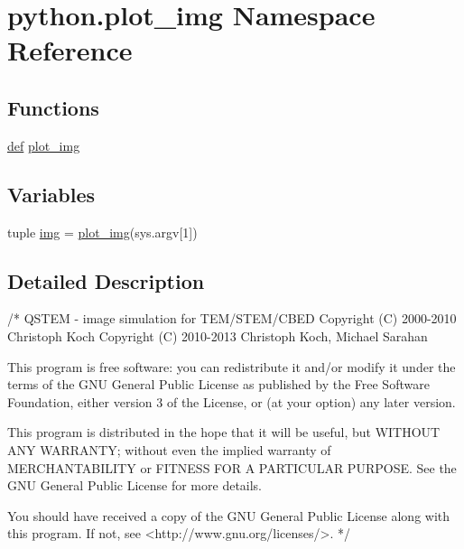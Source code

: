\hypertarget{namespacepython_1_1plot__img}{\section{python.\-plot\-\_\-img Namespace Reference}
\label{namespacepython_1_1plot__img}
}
\subsection*{Functions}
\begin{DoxyCompactItemize}
\item 
\hyperlink{sim_image_from_wave_8m_a72b6b8e83430abf007f20aeae4dc2f74}{def} \hyperlink{namespacepython_1_1plot__img_a047f12ae346602faa26f6aba9c3334e6}{plot\-\_\-img}
\end{DoxyCompactItemize}
\subsection*{Variables}
\begin{DoxyCompactItemize}
\item 
tuple \hyperlink{namespacepython_1_1plot__img_a84ab8c729acf1090901d57022bae03e4}{img} = \hyperlink{namespacepython_1_1plot__img_a047f12ae346602faa26f6aba9c3334e6}{plot\-\_\-img}(sys.\-argv\mbox{[}1\mbox{]})
\end{DoxyCompactItemize}


\subsection{Detailed Description}
\begin{DoxyVerb}/*
QSTEM - image simulation for TEM/STEM/CBED
    Copyright (C) 2000-2010  Christoph Koch
    Copyright (C) 2010-2013  Christoph Koch, Michael Sarahan

    This program is free software: you can redistribute it and/or modify
    it under the terms of the GNU General Public License as published by
    the Free Software Foundation, either version 3 of the License, or
    (at your option) any later version.

    This program is distributed in the hope that it will be useful,
    but WITHOUT ANY WARRANTY; without even the implied warranty of
    MERCHANTABILITY or FITNESS FOR A PARTICULAR PURPOSE.  See the
    GNU General Public License for more details.

    You should have received a copy of the GNU General Public License
    along with this program.  If not, see <http://www.gnu.org/licenses/>.
*/
\end{DoxyVerb}
 

